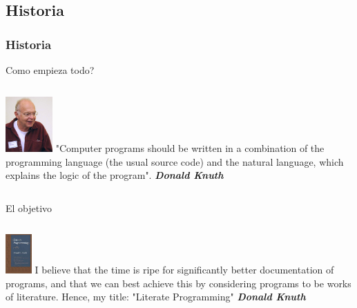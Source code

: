 \documentclass[sans serif,9pt,xcolor=dvipsnames]{beamer}%
\begin{document}
\subsection{Historia}
\begin{frame}
\frametitle{Historia}
\begin{block}{Como empieza todo?}
\begin{columns}
 \hspace{0.7cm}
\includegraphics[width=1.8cm]{imagenes/donald.jpg}
\justifying
"Computer programs should be written in a combination of the programming language (the usual source code) and the natural language, which explains the logic of the program". \textbf{\textit{Donald Knuth}}
\end{columns}
\end{block}

\begin{block}{El objetivo}
\begin{columns}
 \hspace{0.7cm}
\includegraphics[height=1.5cm]{imagenes/book.png} 
\justifying
I believe that the time is ripe for significantly better documentation of programs, and that we can best achieve this by considering programs to be works of literature. Hence, my title: "Literate Programming" \textbf{\textit{Donald Knuth}}
\end{columns}
\end{block}

\end{frame}
\end{document}

